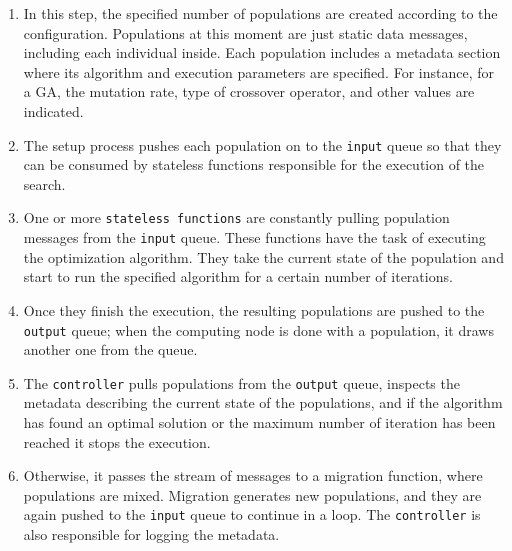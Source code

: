 \documentclass[runningheads]{llncs}
\begin{document}
\begin{enumerate}

\item In this step, the specified number of populations are created according
to the configuration. Populations at this moment are just static data messages,
including each individual inside. Each population includes a metadata section
where its algorithm and execution parameters are specified. For instance, for a
GA, the mutation rate, type of crossover operator, and other values are
indicated.

\item The setup process pushes each population on to the \texttt{input}
queue so that they can be consumed by stateless functions responsible for the
execution of the search.

\item One or more \texttt{stateless functions} are constantly pulling
population messages from the \texttt{input} queue. These functions have the
task of executing the optimization algorithm. They take the current state of
the population and start to run the specified algorithm for a certain number of
iterations.

\item Once they finish the execution, the resulting populations are pushed to
the \texttt{output} queue; when the computing node is done with a population, it draws another one from the
queue.

\item The \texttt{controller} pulls populations from the \texttt{output} queue,
inspects the metadata describing the current state of the populations, and if
the algorithm has found an optimal solution or the maximum number of iteration
has been reached it stops the execution.

\item Otherwise, it passes the stream of messages to a migration function,
where populations are mixed. Migration generates new populations, and they are
again pushed to the \texttt{input} queue to continue in a loop. The
\texttt{controller} is also responsible for logging the metadata.

\end{enumerate}
\end{document}
